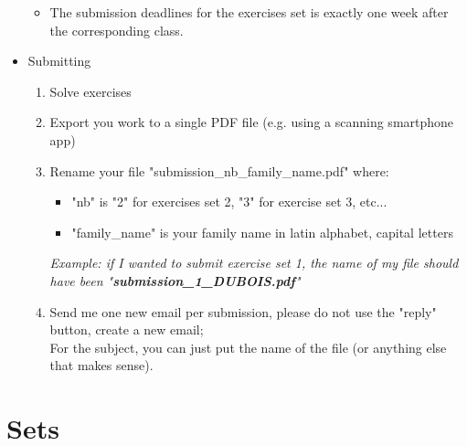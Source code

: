 \documentclass[a4paper,12pt]{article}
\begin{document}
\begin{itemize}
\begin{itemize}
			\item The submission deadlines for the exercises set is exactly one week after the corresponding class.
		\end{itemize}
		\item Submitting
		\begin{enumerate}
			\item Solve exercises
			\item Export you work to a single PDF file (e.g. using a scanning smartphone app)
			\item Rename your file "submission\_{nb}\_{family\_name}.pdf" where:
			\begin{itemize}
				\item "nb" is "2" for exercises set 2, "3" for exercise set 3, etc...
				\item "family\_name" is your family name in latin alphabet, capital letters
			\end{itemize}
			\textit{Example: if I wanted to submit exercise set 1, the name of my file should have been "\textbf{submission\_1\_DUBOIS.pdf}"}
			\item Send me one new email per submission, please do not use the "reply" button, create a new email;\\For the subject, you can just put the name of the file (or anything else that makes sense).
		\end{enumerate}
	\end{itemize}
	
	
	
	
	
	
	\section{Sets}
	
\end{document}
